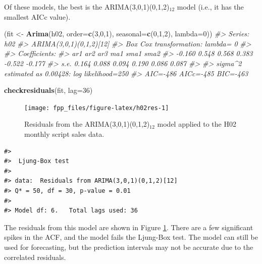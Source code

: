 \documentclass[]{book}
\newenvironment{Shaded}{\begin{snugshade}}{\end{snugshade}}
\newcommand{\CommentTok}[1]{\textcolor[rgb]{0.56,0.35,0.01}{\textit{#1}}}
\newcommand{\DataTypeTok}[1]{\textcolor[rgb]{0.13,0.29,0.53}{#1}}
\newcommand{\DecValTok}[1]{\textcolor[rgb]{0.00,0.00,0.81}{#1}}
\newcommand{\KeywordTok}[1]{\textcolor[rgb]{0.13,0.29,0.53}{\textbf{#1}}}
\newcommand{\NormalTok}[1]{#1}
\newcommand{\StringTok}[1]{\textcolor[rgb]{0.31,0.60,0.02}{#1}}
\begin{document}
Of these models, the best is the ARIMA(3,0,1)(0,1,2)\(_{12}\) model (i.e., it has the smallest AICc value).

\begin{Shaded}
\begin{Highlighting}[]
\NormalTok{(fit <-}\StringTok{ }\KeywordTok{Arima}\NormalTok{(h02, }\DataTypeTok{order=}\KeywordTok{c}\NormalTok{(}\DecValTok{3}\NormalTok{,}\DecValTok{0}\NormalTok{,}\DecValTok{1}\NormalTok{), }\DataTypeTok{seasonal=}\KeywordTok{c}\NormalTok{(}\DecValTok{0}\NormalTok{,}\DecValTok{1}\NormalTok{,}\DecValTok{2}\NormalTok{), }\DataTypeTok{lambda=}\DecValTok{0}\NormalTok{))}
\CommentTok{#> Series: h02 }
\CommentTok{#> ARIMA(3,0,1)(0,1,2)[12] }
\CommentTok{#> Box Cox transformation: lambda= 0 }
\CommentTok{#> }
\CommentTok{#> Coefficients:}
\CommentTok{#>          ar1    ar2    ar3    ma1    sma1    sma2}
\CommentTok{#>       -0.160  0.548  0.568  0.383  -0.522  -0.177}
\CommentTok{#> s.e.   0.164  0.088  0.094  0.190   0.086   0.087}
\CommentTok{#> }
\CommentTok{#> sigma^2 estimated as 0.00428:  log likelihood=250}
\CommentTok{#> AIC=-486   AICc=-485   BIC=-463}
\end{Highlighting}
\end{Shaded}

\begin{Shaded}
\begin{Highlighting}[]
\KeywordTok{checkresiduals}\NormalTok{(fit, }\DataTypeTok{lag=}\DecValTok{36}\NormalTok{)}
\end{Highlighting}
\end{Shaded}

\begin{figure}

{\centering \texttt{[image: fpp\_files/figure-latex/h02res-1]} 

}

\caption{Residuals from the ARIMA(3,0,1)(0,1,2)$_{12}$ model applied to the H02 monthly script sales data.}\label{fig:h02res}
\end{figure}

\begin{verbatim}
#> 
#>  Ljung-Box test
#> 
#> data:  Residuals from ARIMA(3,0,1)(0,1,2)[12]
#> Q* = 50, df = 30, p-value = 0.01
#> 
#> Model df: 6.   Total lags used: 36
\end{verbatim}

The residuals from this model are shown in Figure \ref{fig:h02res}. There are a few significant spikes in the ACF, and the model fails the Ljung-Box test. The model can still be used for forecasting, but the prediction intervals may not be accurate due to the correlated residuals.
\end{document}
